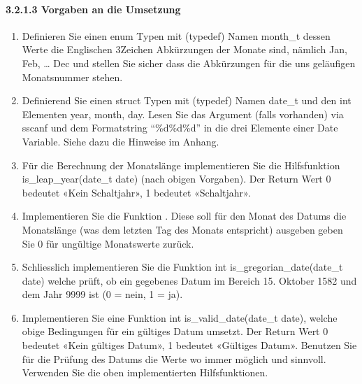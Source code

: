 \documentclass[a4paper,10pt,english]{report}
\begin{document}
\paragraph{3.2.1.3 Vorgaben an die Umsetzung}
\label{\detokenize{P02_Funktionen_Datentyp_enum/README:vorgaben-an-die-umsetzung}}\begin{enumerate}
%
\item {} 
\sphinxAtStartPar
Definieren Sie einen enum Typen mit (typedef) Namen month\_t dessen Werte die Englischen 3\sphinxhyphen{}Zeichen Abkürzungen der Monate sind, nämlich Jan, Feb, … Dec und stellen Sie sicher dass die Abkürzungen für die uns geläufigen Monatsnummer stehen.

\item {} 
\sphinxAtStartPar
Definierend Sie einen struct Typen mit (typedef) Namen date\_t und den int Elementen year, month, day. Lesen Sie das Argument (falls vorhanden) via sscanf und dem Formatstring “\%d\sphinxhyphen{}\%d\sphinxhyphen{}\%d” in die drei Elemente einer Date Variable. Siehe dazu die Hinweise im Anhang.

\item {} 
\sphinxAtStartPar
Für die Berechnung der Monatslänge implementieren Sie die Hilfsfunktion is\_leap\_year(date\_t date) (nach obigen Vorgaben). Der Return Wert 0 bedeutet «Kein Schaltjahr», 1 bedeutet «Schaltjahr».

\item {} 
\sphinxAtStartPar
Implementieren Sie die Funktion . Diese soll für den Monat des Datums die Monatslänge (was dem letzten Tag des Monats ent\sphinxhyphen{}spricht) ausgeben \textendash{} geben Sie 0 für ungültige Monatswerte zurück.

\item {} 
\sphinxAtStartPar
Schliesslich implementieren Sie die Funktion int is\_gregorian\_date(date\_t date) welche prüft, ob ein gegebenes Datum im Bereich 15. Oktober 1582 und dem Jahr 9999 ist (0 = nein, 1 = ja).

\item {} 
\sphinxAtStartPar
Implementieren Sie eine Funktion int is\_valid\_date(date\_t date), welche obige Bedingungen für ein gültiges Datum umsetzt. Der Return Wert 0 bedeutet «Kein gültiges Datum», 1 bedeutet «Gültiges Datum». Benutzen Sie für die Prüfung des Datums die  Werte wo immer möglich und sinnvoll. Verwenden Sie die oben implemen\sphinxhyphen{}tierten Hilfsfunktionen.

\end{enumerate}
\end{document}
